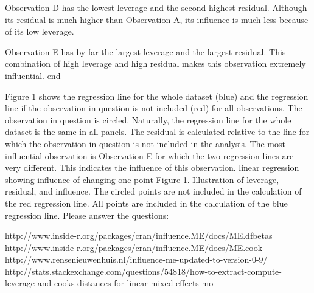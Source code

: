        Observation D has the lowest leverage and the second highest residual. Although its residual is much higher than Observation A, its influence is much less because of its low leverage.

       Observation E has by far the largest leverage and the largest residual. This combination of high leverage and high residual makes this observation extremely influential.
end{ }

Figure 1 shows the regression line for the whole dataset (blue) and the regression line if the observation in question is not included (red) for all observations. The observation in question is circled. Naturally, the regression line for the whole dataset is the same in all panels. The residual is calculated relative to the line for which the observation in question is not included in the analysis. The most influential observation is Observation E for which the two regression lines are very different. This indicates the influence of this observation.
linear regression showing influence of changing one point
Figure 1. Illustration of leverage, residual, and influence. The circled points are not included in the calculation of the red regression line. All points are included in the calculation of the blue regression line.
Please answer the questions:

http://www.inside-r.org/packages/cran/influence.ME/docs/ME.dfbetas
http://www.inside-r.org/packages/cran/influence.ME/docs/ME.cook
http://www.rensenieuwenhuis.nl/influence-me-updated-to-version-0-9/
http://stats.stackexchange.com/questions/54818/how-to-extract-compute-leverage-and-cooks-distances-for-linear-mixed-effects-mo
